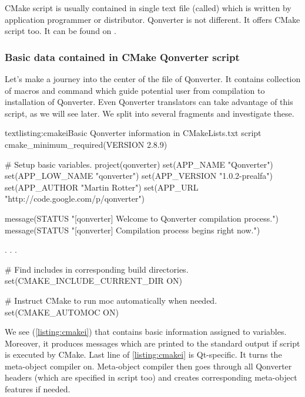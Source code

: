 CMake script is usually contained in single text file (called) which is written by application programmer or distributor. Qonverter is not different. It offers CMake script too. It can be found on \citep{various:qonrepo}. 

\subsubsection{Basic data contained in CMake Qonverter script}
Let's make a journey into the center of the file of Qonverter. It contains collection of macros and command which guide potential user from compilation to installation of Qonverter. Even Qonverter translators can take advantage of this script, as we will see later. We split into several fragments and investigate these.

\begin{fdoccode}{text}{listing:cmakei}{Basic Qonverter information in CMakeLists.txt script}
cmake_minimum_required(VERSION 2.8.9)

# Setup basic variables.
project(qonverter)
set(APP_NAME "Qonverter")
set(APP_LOW_NAME "qonverter")
set(APP_VERSION "1.0.2-prealfa")
set(APP_AUTHOR "Martin Rotter")
set(APP_URL "http://code.google.com/p/qonverter")

message(STATUS "[qonverter] Welcome to Qonverter compilation process.")
message(STATUS "[qonverter] Compilation process begins right now.")

.
.
.

# Find includes in corresponding build directories.
set(CMAKE_INCLUDE_CURRENT_DIR ON)

# Instruct CMake to run moc automatically when needed.
set(CMAKE_AUTOMOC ON)
\end{fdoccode}

We see (\autoref{listing:cmakei}) that contains basic information assigned to variables. Moreover, it produces messages which are printed to the standard output if script is executed by CMake. Last line of \autoref{listing:cmakei} is Qt-specific. It turns the meta-object compiler on. Meta-object compiler then goes through all Qonverter headers (which are specified in script too) and creates corresponding meta-object features if needed.


